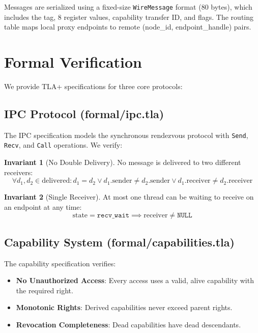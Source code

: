 \documentclass[11pt,letterpaper]{article}
\theoremstyle{definition}
\newtheorem{invariant}{Invariant}[section]
\begin{document}
Messages are serialized using a fixed-size \texttt{WireMessage} format (80
bytes), which includes the tag, 8 register values, capability transfer ID, and
flags. The routing table maps local proxy endpoints to remote
(node\_id, endpoint\_handle) pairs.

\section{Formal Verification}
\label{sec:formal}

We provide TLA+ specifications for three core protocols:

\subsection{IPC Protocol (formal/ipc.tla)}

The IPC specification models the synchronous rendezvous protocol with
\texttt{Send}, \texttt{Recv}, and \texttt{Call} operations. We verify:

\begin{invariant}[No Double Delivery]
No message is delivered to two different receivers:
\[
\forall d_1, d_2 \in \text{delivered}: d_1 = d_2 \lor d_1.\text{sender} \neq d_2.\text{sender} \lor d_1.\text{receiver} \neq d_2.\text{receiver}
\]
\end{invariant}

\begin{invariant}[Single Receiver]
At most one thread can be waiting to receive on an endpoint at any time:
\[
\text{state} = \texttt{recv\_wait} \implies \text{receiver} \neq \texttt{NULL}
\]
\end{invariant}

\subsection{Capability System (formal/capabilities.tla)}

The capability specification verifies:
\begin{itemize}[nosep]
    \item \textbf{No Unauthorized Access}: Every access uses a valid, alive
          capability with the required right.
    \item \textbf{Monotonic Rights}: Derived capabilities never exceed parent
          rights.
    \item \textbf{Revocation Completeness}: Dead capabilities have dead
          descendants.
\end{itemize}
\end{document}
